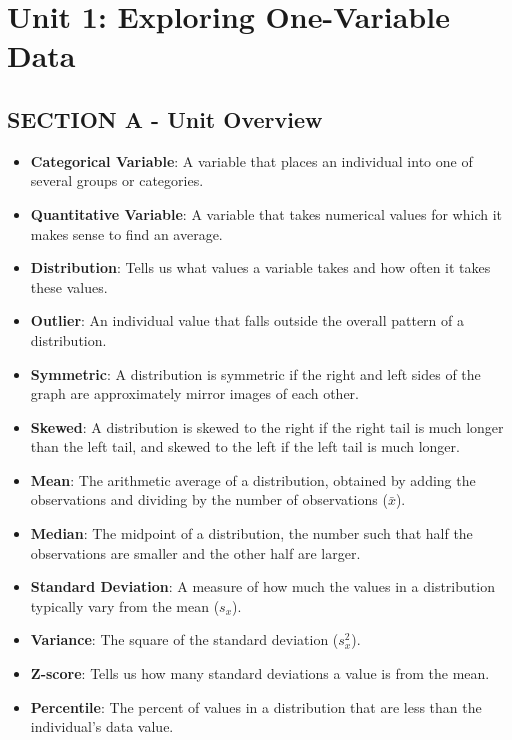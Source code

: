 \chapter{Unit 1: Exploring One-Variable Data}

\section{SECTION A - Unit Overview}
\begin{lessonbox}
\begin{itemize}
    \item \textbf{Categorical Variable}: A variable that places an individual into one of several groups or categories.
    \item \textbf{Quantitative Variable}: A variable that takes numerical values for which it makes sense to find an average.
    \item \textbf{Distribution}: Tells us what values a variable takes and how often it takes these values.
    \item \textbf{Outlier}: An individual value that falls outside the overall pattern of a distribution.
    \item \textbf{Symmetric}: A distribution is symmetric if the right and left sides of the graph are approximately mirror images of each other.
    \item \textbf{Skewed}: A distribution is skewed to the right if the right tail is much longer than the left tail, and skewed to the left if the left tail is much longer.
    \item \textbf{Mean}: The arithmetic average of a distribution, obtained by adding the observations and dividing by the number of observations ($\bar{x}$).
    \item \textbf{Median}: The midpoint of a distribution, the number such that half the observations are smaller and the other half are larger.
    \item \textbf{Standard Deviation}: A measure of how much the values in a distribution typically vary from the mean ($s_x$).
    \item \textbf{Variance}: The square of the standard deviation ($s_x^2$).
    \item \textbf{Z-score}: Tells us how many standard deviations a value is from the mean.
    \item \textbf{Percentile}: The percent of values in a distribution that are less than the individual's data value.
\end{itemize}
\end{lessonbox}

